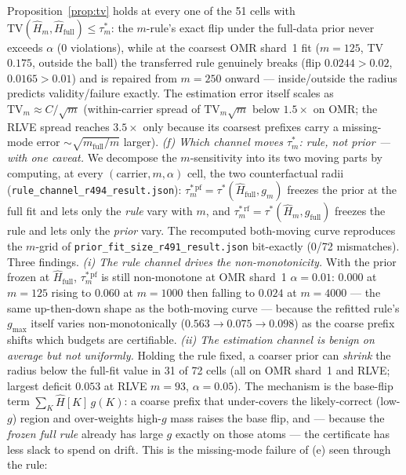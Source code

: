 \documentclass{article}
\theoremstyle{definition}
\theoremstyle{remark}
\begin{document}
Proposition~\ref{prop:tv} holds at every one of the 51 cells with
$\mathrm{TV}(\widehat H_m,\widehat H_{\mathrm{full}})\le\tau^*_m$: the
$m$-rule's exact flip under the full-data prior never exceeds $\alpha$
(0 violations), while at the coarsest OMR shard~1 fit ($m{=}125$, TV
$0.175$, outside the ball) the transferred rule genuinely breaks
(flip $0.0244>0.02$, $0.0165>0.01$) and is repaired from $m{=}250$
onward --- inside/outside the radius predicts validity/failure exactly.
The estimation error itself scales as $\mathrm{TV}_m\approx C/\sqrt m$
(within-carrier spread of $\mathrm{TV}_m\sqrt m$ below $1.5\times$ on OMR;
the RLVE spread reaches $3.5\times$ only because its coarsest prefixes
carry a missing-mode error $\sim\!\sqrt{m_{\mathrm{full}}/m}$ larger).
\emph{(f) Which channel moves $\tau^*_m$: rule, not prior --- with one
caveat.} We decompose the $m$-sensitivity into its two moving parts by
computing, at every $(\text{carrier},m,\alpha)$ cell, the two
counterfactual radii (\texttt{rule\_channel\_r494\_result.json}):
$\tau^{*\,\mathrm{pf}}_m=\tau^*(\widehat H_{\mathrm{full}},g_m)$ freezes
the prior at the full fit and lets only the \emph{rule} vary with $m$,
and $\tau^{*\,\mathrm{rf}}_m=\tau^*(\widehat H_m,g_{\mathrm{full}})$
freezes the rule and lets only the \emph{prior} vary. The recomputed
both-moving curve reproduces the $m$-grid of
\texttt{prior\_fit\_size\_r491\_result.json} bit-exactly (0/72
mismatches). Three findings. \emph{(i) The rule channel drives the
non-monotonicity.} With the prior frozen at $\widehat H_{\mathrm{full}}$,
$\tau^{*\,\mathrm{pf}}_m$ is still non-monotone at OMR shard~1
$\alpha{=}0.01$: $0.000$ at $m{=}125$ rising to $0.060$ at $m{=}1000$
then falling to $0.024$ at $m{=}4000$ --- the same up-then-down shape as
the both-moving curve --- because the refitted rule's $g_{\max}$ itself
varies non-monotonically ($0.563\to0.075\to0.098$) as the coarse prefix
shifts which budgets are certifiable. \emph{(ii) The estimation channel
is benign on average but \emph{not} uniformly.} Holding the rule fixed,
a coarser prior can \emph{shrink} the radius below the full-fit value in
31 of 72 cells (all on OMR shard~1 and RLVE; largest deficit $0.053$ at
RLVE $m{=}93$, $\alpha{=}0.05$). The mechanism is the base-flip term
$\sum_K \widehat H[K]\,g(K)$: a coarse prefix that under-covers the
likely-correct (low-$g$) region and over-weights high-$g$ mass raises the
base flip, and --- because the \emph{frozen full rule} already has large
$g$ exactly on those atoms --- the certificate has less slack to spend on
drift. This is the missing-mode failure of (e) seen through the rule:
\end{document}
